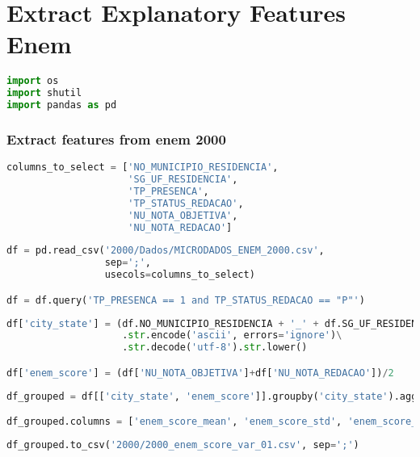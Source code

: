 \hypertarget{extract-explanatory-features}{%
\section{Extract Explanatory
Features Enem}\label{extract-explanatory-features}}

\begin{lstlisting}[language=Python]
import os
import shutil
import pandas as pd
\end{lstlisting}

\hypertarget{extract-features-from-enem-2000}{%
\subsubsection{Extract features from enem
2000}\label{extract-features-from-enem-2000}}

\begin{lstlisting}[language=Python]
columns_to_select = ['NO_MUNICIPIO_RESIDENCIA',
                     'SG_UF_RESIDENCIA',
                     'TP_PRESENCA',
                     'TP_STATUS_REDACAO',
                     'NU_NOTA_OBJETIVA',
                     'NU_NOTA_REDACAO']
\end{lstlisting}

\begin{lstlisting}[language=Python]
df = pd.read_csv('2000/Dados/MICRODADOS_ENEM_2000.csv',
                 sep=';',
                 usecols=columns_to_select)

df = df.query('TP_PRESENCA == 1 and TP_STATUS_REDACAO == "P"')
\end{lstlisting}

\begin{lstlisting}[language=Python]
df['city_state'] = (df.NO_MUNICIPIO_RESIDENCIA + '_' + df.SG_UF_RESIDENCIA).str.normalize('NFKD')\
                    .str.encode('ascii', errors='ignore')\
                    .str.decode('utf-8').str.lower()

df['enem_score'] = (df['NU_NOTA_OBJETIVA']+df['NU_NOTA_REDACAO'])/2
\end{lstlisting}

\begin{lstlisting}[language=Python]
df_grouped = df[['city_state', 'enem_score']].groupby('city_state').agg(['mean', 'std', 'median'])

df_grouped.columns = ['enem_score_mean', 'enem_score_std', 'enem_score_median']
\end{lstlisting}

\begin{lstlisting}[language=Python]
df_grouped.to_csv('2000/2000_enem_score_var_01.csv', sep=';')
\end{lstlisting}

